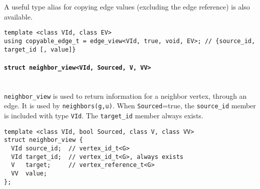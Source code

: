 \documentclass[10pt,onecolumn]{article}
\newcommand{\tcode}[1]{\lstinline[breaklines=true]{#1}}
\begin{document}
A useful type alias for copying edge values (excluding the edge reference) is also available.
\begin{lstlisting}
template <class VId, class EV>
using copyable_edge_t = edge_view<VId, true, void, EV>; // {source_id, target_id [, value]}
\end{lstlisting}


\paragraph{\tcode{struct neighbor_view<VId, Sourced, V, VV>}}\label{neighbor-view}\mbox{} \\
\tcode{neighbor_view} is used to return information for a neighbor vertex, through an edge. It is used by \tcode{neighbors(g,u)}. When \tcode{Sourced}=true, the \tcode{source_id} member is included with type \tcode{VId}. The \tcode{target_id} member always exists.

\begin{lstlisting}
template <class VId, bool Sourced, class V, class VV>
struct neighbor_view {
  VId source_id;  // vertex_id_t<G>
  VId target_id;  // vertex_id_t<G>, always exists
  V   target;     // vertex_reference_t<G>
  VV  value;
};
\end{lstlisting}
\end{document}
